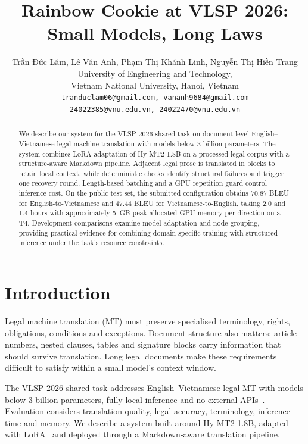 \documentclass[11pt]{article}
\begin{document}
\title{Rainbow Cookie at VLSP 2026: Small Models, Long Laws}

\author{Trần Đức Lâm, Lê Vân Anh, Phạm Thị Khánh Linh, Nguyễn Thị Hiền Trang \\
University of Engineering and Technology, \\
Vietnam National University, Hanoi, Vietnam \\
\texttt{\small tranduclam06@gmail.com, vananh9684@gmail.com} \\
\texttt{\small 24022385@vnu.edu.vn, 24022470@vnu.edu.vn}}

\maketitle

\begin{abstract}
We describe our system for the VLSP 2026 shared task on document-level English--Vietnamese legal machine translation with models below 3 billion parameters. The system combines LoRA adaptation of Hy-MT2-1.8B on a processed legal corpus with a structure-aware Markdown pipeline. Adjacent legal prose is translated in blocks to retain local context, while deterministic checks identify structural failures and trigger one recovery round. Length-based batching and a GPU repetition guard control inference cost. On the public test set, the submitted configuration obtains 70.87 BLEU for English-to-Vietnamese and 47.44 BLEU for Vietnamese-to-English, taking 2.0 and 1.4 hours with approximately 5~GB peak allocated GPU memory per direction on a T4. Development comparisons examine model adaptation and node grouping, providing practical evidence for combining domain-specific training with structured inference under the task's resource constraints.
\end{abstract}

\section{Introduction}
Legal machine translation (MT) must preserve specialised terminology, rights, obligations, conditions and exceptions. Document structure also matters: article numbers, nested clauses, tables and signature blocks carry information that should survive translation. Long legal documents make these requirements difficult to satisfy within a small model's context window.

The VLSP 2026 shared task addresses English--Vietnamese legal MT with models below 3 billion parameters, fully local inference and no external APIs~\cite{vlsp2026}. Evaluation considers translation quality, legal accuracy, terminology, inference time and memory. We describe a system built around Hy-MT2-1.8B, adapted with LoRA~\cite{hu2022lora} and deployed through a Markdown-aware translation pipeline.
\end{document}
